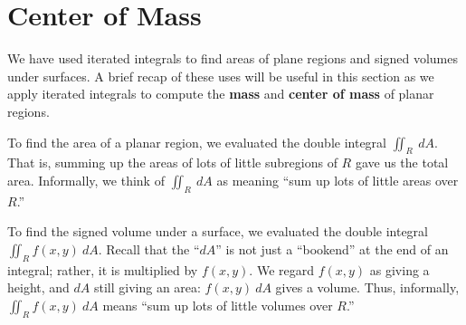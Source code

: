 \section{Center of Mass}\label{sec:center_of_mass}

We have used iterated integrals to find areas of plane regions and signed volumes under surfaces. A brief recap of these uses will be useful in this section as we apply iterated integrals to compute the \textbf{mass} and \textbf{center of mass} of planar regions.

To find the area of a planar region, we evaluated the double integral $\iint_R\ dA$. That is, summing up the areas of lots of little subregions of $R$ gave us the total area. Informally, we think of $\iint_R\ dA$ as meaning ``sum up lots of little areas over $R$.''

To find the signed volume under a surface, we evaluated the double integral $\iint_R f(x,y)\ dA$. Recall that the ``$dA$'' is not just a ``bookend'' at the end of an integral; rather, it is multiplied by $f(x,y)$. We regard $f(x,y)$ as giving a height, and $dA$ still giving an area: $f(x,y)\ dA$ gives a volume. Thus, informally, $\iint_Rf(x,y)\ dA$ means ``sum up lots of little volumes over $R$.''

